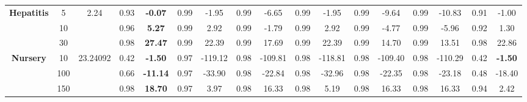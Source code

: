 \documentclass[letterpaper]{article}
\theoremstyle{definition}
\begin{document}
\begin{table}[t]
\begin{tabular}{|c|c|c|c|c|c|c|c|c|c|c|c|c|c|c|c|c|}
\multirow{3}{*}{\textbf{Hepatitis}} & 5        & 2.24     & 0.93  & \textbf{-0.07}   & 0.99      & -1.95        & 0.99   & -6.65             & 0.99      & -1.95        & 0.99  & -9.64            & 0.99     & -10.83             & 0.91    & -1.00           \\ \cline{2-17}
                                    & 10       &          & 0.96  & \textbf{5.27}    & 0.99      & 2.92         & 0.99   & -1.79             & 0.99      & 2.92         & 0.99  & -4.77            & 0.99     & -5.96              & 0.92    & 1.30            \\ \cline{2-17}
                                    & 30       &          & 0.98  & \textbf{27.47}   & 0.99      & 22.39        & 0.99   & 17.69             & 0.99      & 22.39        & 0.99  & 14.70            & 0.99     & 13.51              & 0.98    & 22.86           \\ \hline

\multirow{3}{*}{\textbf{Nursery}}   & 10       & 23.24092 & 0.42  & \textbf{-1.50}   & 0.97      & -119.12      & 0.98   & -109.81           & 0.98      & -118.81      & 0.98      & -109.40      & 0.98         & -110.29        & 0.42   & \textbf{-1.50}   \\ \cline{2-17}
                                    & 100      &          & 0.66  & \textbf{-11.14}  & 0.97      & -33.90       & 0.98   & -22.84            & 0.98      & -32.96       & 0.98      & -22.35       & 0.98         & -23.18         & 0.48   & -18.40           \\ \cline{2-17}
                                    & 150      &          & 0.98  & \textbf{18.70}   & 0.97      & 3.97         & 0.98   & 16.33             & 0.98      & 5.19         & 0.98      & 16.33        & 0.98         & 16.33          & 0.94   & 2.42             \\ \hline


\end{tabular}
\end{table}
\end{document}
